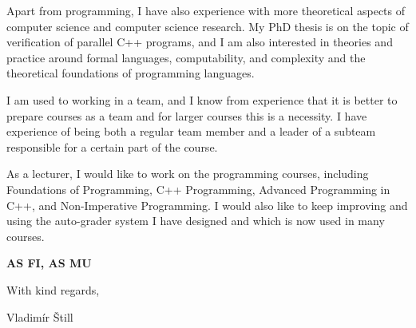 \documentclass[11pt,a4paper]{article}
\newcommand{\TODO}[1]{{\bf\color{red}#1}}
\begin{document}
Apart from programming, I have also experience with more theoretical aspects of computer science and computer science research.
My PhD thesis is on the topic of verification of parallel C++ programs, and I am also interested in theories and practice around formal languages, computability, and complexity and the theoretical foundations of programming languages.

I am used to working in a team, and I know from experience that it is better to prepare courses as a team and for larger courses this is a necessity.
I have experience of being both a regular team member and a leader of a subteam responsible for a certain part of the course.

As a lecturer, I would like to work on the programming courses, including Foundations of Programming, C++ Programming, Advanced Programming in C++, and Non-Imperative Programming.
I would also like to keep improving and using the auto-grader system I have designed and which is now used in many courses.

\TODO{AS FI, AS MU}

\smallskip
With kind regards,\par
Vladimír Štill
\end{document}

